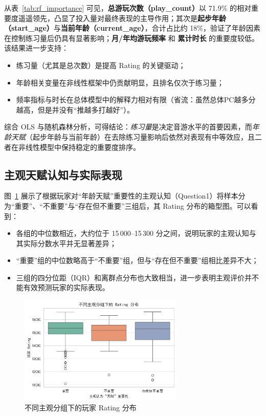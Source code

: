 \documentclass[12pt]{article}
\begin{document}
从表~\ref{tab:rf_importance} 可见，\textbf{总游玩次数（play\_count）}以 71.9\% 的相对重要度遥遥领先，凸显了投入量对最终表现的主导作用；其次是\textbf{起步年龄（start\_age）}与\textbf{当前年龄（current\_age）}，合计占比约 18\%，验证了年龄因素在控制练习量后仍具有显著影响；\textbf{月/年均游玩频率} 和 \textbf{累计时长} 的重要度较低。该结果进一步支持：  
\begin{itemize}
	\item 练习量（尤其是总次数）是提高 Rating 的关键驱动；  
	\item 年龄相关变量在非线性框架中仍贡献明显，且排名仅次于练习量；  
	\item 频率指标与时长在总体模型中的解释力相对有限（省流：虽然总体PC越多分越高，但是并没有“推越多打越好”）。  
\end{itemize}

综合 OLS 与随机森林分析，可得结论：\emph{练习量}是决定音游水平的首要因素，而\emph{年龄天赋}（起步年龄与当前年龄）在去除练习量影响后依然对表现有中等效应，且二者在非线性模型中保持稳定的重要度排序。

\subsection{主观天赋认知与实际表现}

图~\ref{fig:belief_box} 展示了根据玩家对“年龄天赋”重要性的主观认知（Question1）将样本分为“重要”、“不重要”与“存在但不重要”三组后，其 Rating 分布的箱型图。可以看到：
\begin{itemize}
	\item 各组的中位数相近，大约位于 15\,000–15\,300 分之间，说明玩家的主观认知与其实际分数水平并无显著差异；  
	\item “重要”组的中位数略高于“不重要”组，但与“存在但不重要”组相比差异不大；  
	\item 三组的四分位距（IQR）和离群点分布也大致相当，进一步表明主观评价并不能有效预测玩家的实际表现。
\end{itemize}

\begin{figure}[htbp]
	\centering
	\includegraphics[width=0.7\textwidth]{fig6.png}
	\caption{不同主观分组下的玩家 Rating 分布}
	\label{fig:belief_box}
\end{figure}
\end{document}
